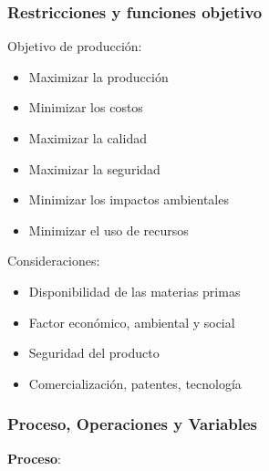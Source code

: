         \subsubsection{Restricciones y funciones objetivo}
        
        Objetivo de producción:
        
        \begin{multicols}{2}
            \begin{itemize}
                \item Maximizar la producción
                \item Minimizar los costos
                \item Maximizar la calidad
                \item Maximizar la seguridad
                \item Minimizar los impactos ambientales
                \item Minimizar el uso de recursos
            \end{itemize}
        \end{multicols}
        
        Consideraciones:
        
        \begin{multicols}{2}
            \begin{itemize}
                \item Disponibilidad de las materias primas
                \item Factor económico, ambiental y social
                \item Seguridad del producto
                \item Comercialización, patentes, tecnología
            \end{itemize}
        \end{multicols}
    
        \subsubsection{Proceso, Operaciones y Variables}
        
        \textbf{Proceso}:
            
        \begin{quote}
            \textit{}
        \end{quote}
        
